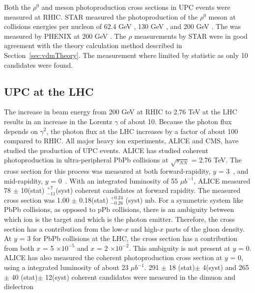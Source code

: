     Both the $\rho^{0}$ and \JPsi{} meson photoproduction cross sections in UPC 
      events were measured at RHIC.
    STAR measured the photoproduction of the $\rho^{0}$ meson at collisions 
      energies per nucleon of 62.4 GeV \cite{upcRhoSTAR12}, 130 GeV 
      \cite{upcRhoSTAR02}, and 200 GeV \cite{upcRhoSTAR08}. 
    The \JPsi{} was measured by PHENIX at 200 GeV \cite{upcJPsiPHENIX}.
    The $\rho$ measurements by STAR were in good agreement with the theory
      calculation method described in Section~\ref{sec:vdmTheory}.
    The \JPsi{ } measurement where limited by statistic as only 10 \JPsi{}
      candidates were found. 

  \subsection{ UPC \JPsi{} at the LHC}
    The increase in beam energy from 200 GeV at RHIC to 2.76 TeV at the LHC 
      results in an increase in the Lorentz $\gamma$ of about 10.
    Because the photon flux depends on $\gamma^{2}$, the photon flux
      at the LHC increases by a factor of about 100 compared to RHIC.
    All major heavy ion experiments, ALICE and CMS, have studied the production
      of UPC events. 
    ALICE has studied coherent \JPsi{} photoproduction in ultra-peripheral PbPb
      collisions at $\sqrt{s_{NN}}$ = 2.76 TeV. 
   The cross section for this process was measured at both forward-rapidity, 
      $y$ = 3~\cite{Abelev:2012ba}, and mid-rapidity, $y$ = 0~\cite{Abbas:2013oua}.
   With an integrated luminosity of 55 $\mu$$b^{-1}$, ALICE measured 
     78 $\pm$ 10(stat) $^{+7}_{-11}$(syst) coherent \JPsi{} candidates at 
     forward rapidity.
   The measured cross section was 1.00 $\pm$ 0.18(stat) $_{-0.26}^{+0.24}$ 
    (syst) mb.
   For a symmetric system like PbPb collisions, as opposed to pPb collisions, 
    there is an ambiguity between which ion is the target and which is the 
    photon emitter. 
  Therefore, the cross section has a contribution from the low-$x$ and high-$x$ 
    parts of the gluon density. 
  At $y$ = 3  for PbPb collisions at the LHC, the cross section has a 
    contribution from both $x$ = 5 $\times 10^{-5}$ and $x$ = 2  $\times 
    10^{-2}$.
  This ambiguity is not present at $y$ = 0.
  ALICE has also measured the coherent \JPsi{} photoproduction cross section 
    at $y$ = 0, using a integrated luminosity of about 23 $\mu$$b^{-1}$.
  291 $\pm$ 18 (stat)$\pm$ 4(syst) and 265 $\pm$ 40 (stat)$\pm$ 12(syst) 
    coherent \JPsi{} candidates were measured in the dimuon and dielectron
